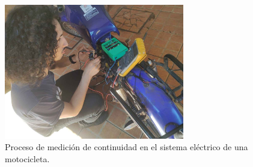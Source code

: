 \vspace{.5cm}


\begin{figure}[H]
\leavevmode
\begin{minipage}{\textwidth}
\begin{center}
\includegraphics[width=0.7\textwidth]{./anexos/imagen/medicion.jpg}
\caption{Proceso de medición de continuidad en el sistema eléctrico de una motocicleta.\label{fig:moto3}}
\end{center}
\end{minipage}
\end{figure}

\vspace{.5cm}

